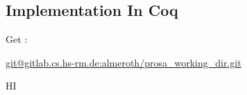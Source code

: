 
\subsection{Implementation In Coq}

Get : 

\url{git@gitlab.cs.hs-rm.de:almeroth/prosa_working_dir.git}




HI



